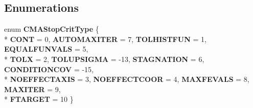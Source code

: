 \subsection*{Enumerations}
\begin{DoxyCompactItemize}
\item 
enum {\bfseries C\-M\-A\-Stop\-Crit\-Type} \{ \\*
{\bfseries C\-O\-N\-T} = 0, 
{\bfseries A\-U\-T\-O\-M\-A\-X\-I\-T\-E\-R} = 7, 
{\bfseries T\-O\-L\-H\-I\-S\-T\-F\-U\-N} = 1, 
{\bfseries E\-Q\-U\-A\-L\-F\-U\-N\-V\-A\-L\-S} = 5, 
\\*
{\bfseries T\-O\-L\-X} = 2, 
{\bfseries T\-O\-L\-U\-P\-S\-I\-G\-M\-A} = -\/13, 
{\bfseries S\-T\-A\-G\-N\-A\-T\-I\-O\-N} = 6, 
{\bfseries C\-O\-N\-D\-I\-T\-I\-O\-N\-C\-O\-V} = -\/15, 
\\*
{\bfseries N\-O\-E\-F\-F\-E\-C\-T\-A\-X\-I\-S} = 3, 
{\bfseries N\-O\-E\-F\-F\-E\-C\-T\-C\-O\-O\-R} = 4, 
{\bfseries M\-A\-X\-F\-E\-V\-A\-L\-S} = 8, 
{\bfseries M\-A\-X\-I\-T\-E\-R} = 9, 
\\*
{\bfseries F\-T\-A\-R\-G\-E\-T} = 10
 \}
\end{DoxyCompactItemize}
